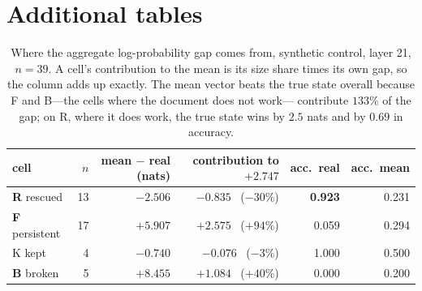 \section{Additional tables}

\begin{table}[tbp]
\caption{Where the aggregate log-probability gap comes from, synthetic control,
layer 21, $n=39$. A cell's contribution to the mean is its size share times its
own gap, so the column adds up exactly. The mean vector beats the true state
overall because F and B---the cells where the document does not work---%
contribute $133\%$ of the gap; on R, where it does work, the true state wins by
$2.5$ nats and by $0.69$ in accuracy.}
\label{tab:cells}
\centering
\small
\begin{tabular}{lrrrrr}
\toprule
\rowcolor{TableHeader}
cell & $n$ & mean $-$ real (nats) & contribution to $+2.747$ & acc.\ real & acc.\ mean \\
\midrule
\textbf{R} rescued    & 13 & $-2.506$ & $-0.835$ \ ($-30\%$) & \textbf{0.923} & 0.231 \\
\textbf{F} persistent & 17 & $+5.907$ & $+2.575$ \ ($+94\%$) & 0.059 & 0.294 \\
K kept                &  4 & $-0.740$ & $-0.076$ \ ($-3\%$)  & 1.000 & 0.500 \\
\textbf{B} broken     &  5 & $+8.455$ & $+1.084$ \ ($+40\%$) & 0.000 & 0.200 \\
\bottomrule
\end{tabular}
\end{table}



\begin{table}[tbp]
\caption{The numbers behind Figure~\ref{fig:channels}, restricted as the figure
is to the calculators whose receiver never solves an item.}
\label{tab:battery}
\centering
\small

\end{table}

\begin{table}[tbp]
\caption{The document-span depth sweep over all forty items, unrestricted.
Compare Table~\ref{tab:realspandepth}: the profile is the same shape with a
higher floor, because the calculators this adds are ones a wrong document
already rescues.}
\label{tab:realspan-all}
\centering
\small

\end{table}

